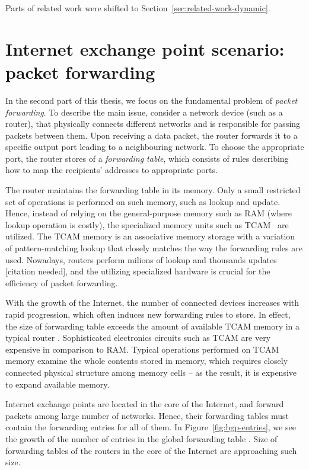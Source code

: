 Parts of related work were shifted to Section~\ref{sec:related-work-dynamic}.




\section{Internet exchange point scenario: packet forwarding}
\label{sec:intro-packet-forwarding}

In the second part of this thesis, we focus on the fundamental problem of \emph{packet forwarding}.
To describe the main issue, consider a network device (such as a router), that physically connects different networks and is responsible for passing packets between them.
Upon receiving a data packet, the router forwards it to a specific output port leading to a neighbouring network.
To choose the appropriate port, the router stores of a \emph{forwarding table}, which consists of rules describing how to map the recipients' addresses to appropriate ports.

The router maintains the forwarding table in its memory.
Only a small restricted set of operations is performed on such memory, such as lookup and update.
Hence, instead of relying on the general-purpose memory such as RAM (where lookup operation is costly), the specialized memory units such as TCAM~\cite{tcam-memory} are utilized.
The TCAM memory is an associative memory storage with a variation of pattern-matching lookup that closely matches the way the forwarding rules are used.
Nowadays, routers perform milions of lookup and thousands updates [citation needed], and the utilizing specialized hardware is crucial for the efficiency of packet forwarding.

With the growth of the Internet, the number of connected devices increases with rapid progression, which often induces new forwarding rules to store.
In effect, the size of forwarding table exceeds the amount of available TCAM memory in a typical router .
Sophisticated electronics circuits such as TCAM are very expensive in comparison to RAM.
Typical operations performed on TCAM memory examine the whole contents stored in memory, which requires closely connected physical structure among memory cells -- as the result, it is expensive to expand available memory.

Internet exchange points are located in the core of the Internet, and forward packets among large number of networks.
Hence, their forwarding tables must contain the forwarding entries for all of them.
In Figure~\ref{fig:bgp-entries}, we see the growth of the number of entries in the global forwarding table \cite{url-bgp-entries}.
Size of forwarding tables of the routers in the core of the Internet are approaching such size.

